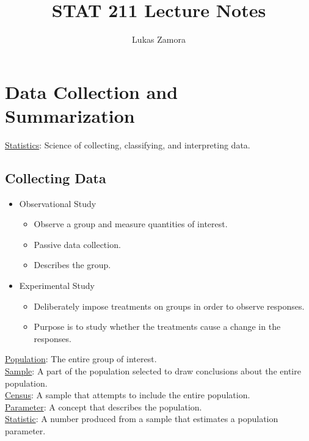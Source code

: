 \documentclass[11pt]{article}
\title{STAT 211 Lecture Notes}
\author{Lukas Zamora}
\date{}
\begin{document}
	
	\maketitle
	
	\section{Data Collection and Summarization}
	
	\underline{Statistics}: Science of collecting, classifying, and interpreting data.
	
	\subsection*{Collecting Data}
	
	\begin{itemize}
		\item Observational Study
			\begin{itemize}
				\item Observe a group and measure quantities of interest.
				\item Passive data collection.
				\item Describes the group.
			\end{itemize}
		\item Experimental Study
			\begin{itemize}
				\item Deliberately impose treatments on groups in order to observe responses.
				\item Purpose is to study whether the treatments cause a change in the responses.
			\end{itemize}
	\end{itemize}

	\underline{Population}: The entire group of interest.\\
	
	\underline{Sample}: A part of the population selected to draw conclusions about the entire population.\\
	
	\underline{Census}: A sample that attempts to include the entire population.\\
	
	\underline{Parameter}: A concept that describes the population.\\
	
	\underline{Statistic}: A number produced from a sample that estimates a population parameter.\\
	
\end{document}
